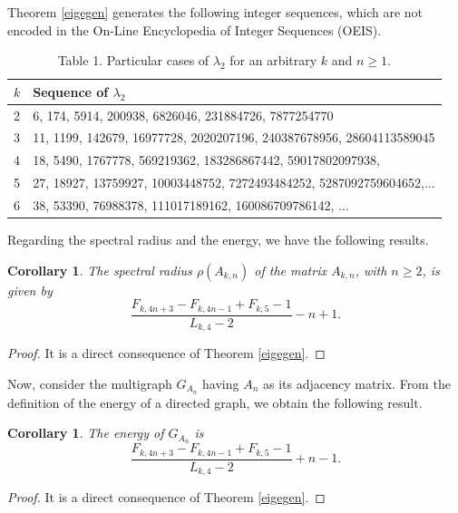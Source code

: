 \documentclass[11pt]{birkjour}
\newtheorem{cor}[thm]{Corollary}
\theoremstyle{definition}
\theoremstyle{remark}
\numberwithin{equation}{section}
\begin{document}
\noindent Theorem \ref{eigegen} generates the following integer sequences, which are not encoded in the On-Line Encyclopedia of Integer Sequences (OEIS).


\begin{table}[h!]
\begin{tabular}{|l|l|}
\hline $k$ & Sequence of $\lambda_{2}$ \\
\hline 2 & 6, 174, 5914, 200938, 6826046, 231884726, 7877254770    \\
\hline 3 &  11, 1199, 142679, 16977728, 2020207196, 240387678956, 28604113589045 \\
\hline 4 &  18, 5490, 1767778, 569219362, 183286867442, 59017802097938,   \\
\hline 5 & 27, 18927, 13759927, 10003448752, 7272493484252, 5287092759604652,... \\
\hline 6 & 38, 53390, 76988378, 111017189162, 160086709786142, ...  \\
\hline
\end{tabular}
\captionsetup{labelformat=empty}
\caption{Table 1. Particular cases of $\lambda_{2}$ for an arbitrary $k$ and $n\geq 1$.}
\end{table}

\noindent Regarding the spectral radius and the energy, we have the following results.

\begin{cor}
The spectral radius $\rho(A_{k,n})$ of the matrix $A_{k,n}$, with $n \geq 2$, is given by
\[
\frac{F_{k,4n + 3} - F_{k,4n - 1} + F_{k,5} - 1}{L_{k,4}-2} - n + 1.
\]
\end{cor}

\begin{proof}
It is a direct consequence of Theorem \ref{eigegen}.
\end{proof}

\noindent Now, consider the multigraph $G_{A_n}$ having $A_n$ as its adjacency matrix.
From the definition of the energy of a directed graph, we obtain the following result.

\begin{cor}
The energy of $G_{A_{n}}$ is
\[
\frac{F_{k,4n + 3} - F_{k,4n - 1} + F_{k,5} - 1}{L_{k,4}-2} + n - 1.
\]
\end{cor}

\begin{proof}
It is a direct consequence of Theorem \ref{eigegen}.
\end{proof}
\end{document}

